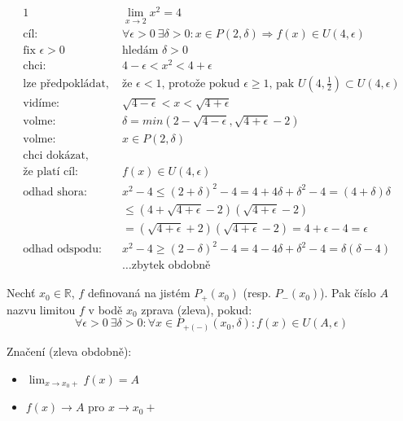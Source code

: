 \begin{example}
    \begin{alignat}{1}
        &\lim_{x\to 2}x^2=4 \\
        \text{cíl:}\quad& \forall\epsilon>0~\exists\delta>0:x\in P(2,\delta)
            \Rightarrow f(x)\in U(4,\epsilon) \\
        \text{fix $\epsilon>0$}\quad& \text{hledám $\delta>0$} \\
        \text{chci:}\quad& 4-\epsilon<x^2<4+\epsilon \\
        \text{lze předpokládat, }& \text{že $\epsilon<1$, protože pokud $\epsilon\geq 1$,
            pak $U(4,\frac{1}{2})\subset U(4,\epsilon)$} \\
        \text{vidíme:}\quad& \sqrt{4-\epsilon}<x<\sqrt{4+\epsilon} \\
        \text{volme:}\quad& \delta=min(2-\sqrt{4-\epsilon}, \sqrt{4+\epsilon}-2) \\
        \text{volme:}\quad& x\in P(2,\delta) \\
        \text{chci dokázat,}\quad& \\
        \text{že platí cíl:}\quad& f(x)\in U(4,\epsilon) \\
        \text{odhad shora:}\quad& x^2-4\leq(2+\delta)^2-4=4+4\delta+\delta^2-4=(4+\delta)\delta \\
        & \leq(4+\sqrt{4+\epsilon}-2)(\sqrt{4+\epsilon}-2) \\
        & =(\sqrt{4+\epsilon}+2)(\sqrt{4+\epsilon}-2)=4+\epsilon-4=\epsilon \\
        \text{odhad odspodu:}\quad& x^2-4\geq(2-\delta)^2-4=4-4\delta+\delta^2-4=\delta(\delta-4) \\
        & \dots\text{zbytek obdobně}
    \end{alignat}
\end{example}

\begin{definition}
    Nechť $x_0\in\mathbb{R}$, $f$ definovaná na jistém $P_+(x_0)$ (resp. $P_-(x_0)$). Pak
        číslo $A$ nazvu limitou $f$ v bodě $x_0$ zprava (zleva), pokud:
    \begin{equation}
        \forall\epsilon>0~\exists\delta>0:\forall x\in P_{+(-)}(x_0,\delta):f(x)\in U(A,\epsilon)
    \end{equation}

    Značení (zleva obdobně):
    \begin{itemize}
        \item $\lim_{x\to x_0+}f(x)=A$
        \item $f(x)\rightarrow A$ pro $x\rightarrow x_0+$
    \end{itemize}
\end{definition}


